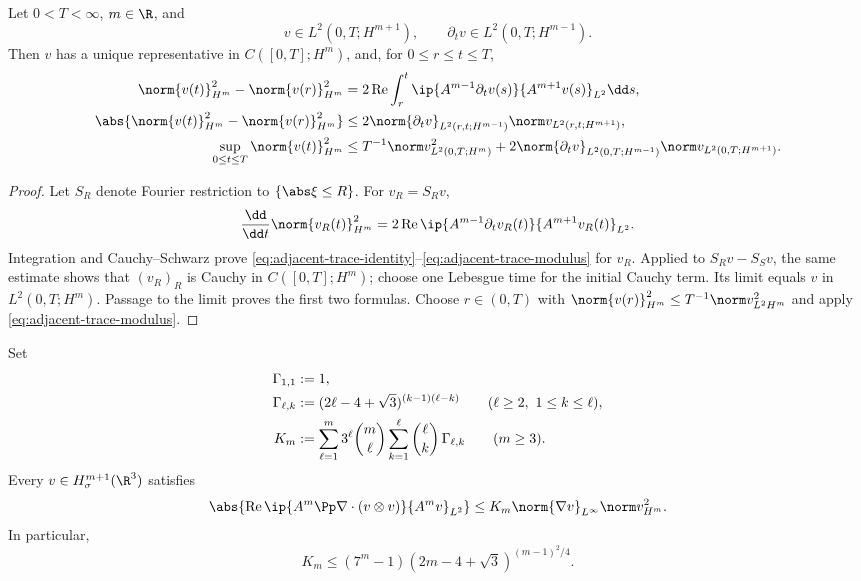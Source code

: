 \begin{lemma}
\label{lem:adjacent-trace}
Let \(0<T<\infty\), \(m\in\R\), and
\[
 v\in L^2(0,T;H^{m+1}),
 \qquad
 \partial_tv\in L^2(0,T;H^{m-1}).
\]
Then \(v\) has a unique representative in \(C([0,T];H^m)\), and, for
\(0\le r\le t\le T\),
\begin{align}
 \norm{v(t)}_{H^m}^2-\norm{v(r)}_{H^m}^2
 &=2\operatorname{Re}\int_r^t
 \ip{A^{m-1}\partial_tv(s)}{A^{m+1}v(s)}_{L^2}\dd s,
 \label{eq:adjacent-trace-identity}\\
 \abs{\norm{v(t)}_{H^m}^2-\norm{v(r)}_{H^m}^2}
 &\le2\norm{\partial_tv}_{L^2(r,t;H^{m-1})}
 \norm v_{L^2(r,t;H^{m+1})},
 \label{eq:adjacent-trace-modulus}\\
 \sup_{0\le t\le T}\norm{v(t)}_{H^m}^2
 &\le T^{-1}\norm v_{L^2(0,T;H^m)}^2
 +2\norm{\partial_tv}_{L^2(0,T;H^{m-1})}
 \norm v_{L^2(0,T;H^{m+1})}.
 \label{eq:adjacent-trace-sup}
\end{align}
\end{lemma}

\begin{proof}
Let \(S_R\) denote Fourier restriction to \(\{\abs\xi\le R\}\).  For
\(v_R=S_Rv\),
\[
 \frac{\dd}{\dd t}\norm{v_R(t)}_{H^m}^2
 =2\operatorname{Re}\ip{A^{m-1}\partial_tv_R(t)}
 {A^{m+1}v_R(t)}_{L^2}.
\]
Integration and Cauchy--Schwarz prove
\eqref{eq:adjacent-trace-identity}--\eqref{eq:adjacent-trace-modulus} for
\(v_R\).  Applied to \(S_Rv-S_Sv\), the same estimate shows that
\((v_R)_R\) is Cauchy in \(C([0,T];H^m)\); choose one Lebesgue time for the
initial Cauchy term.  Its limit equals \(v\) in
\(L^2(0,T;H^m)\).  Passage to the limit proves the first two formulas.
Choose \(r\in(0,T)\) with
\(\norm{v(r)}_{H^m}^2\le T^{-1}\norm v_{L^2H^m}^2\) and apply
\eqref{eq:adjacent-trace-modulus}.
\end{proof}

\begin{lemma}
\label{lem:transport-commutator}
Set
\begin{align}
 \Gamma_{1,1}&:=1,\notag\\
 \Gamma_{\ell,k}
 &:=(2\ell-4+\sqrt3)^{(k-1)(\ell-k)}
 \qquad(\ell\ge2,\ 1\le k\le\ell),
 \label{eq:explicit-Gamma-lk}\\
 K_m&:=
 \sum_{\ell=1}^{m}3^\ell\binom m\ell
 \sum_{k=1}^{\ell}\binom\ell k\,\Gamma_{\ell,k}
 \qquad(m\ge3).
 \label{eq:explicit-commutator-constant}
\end{align}
Every \(v\in H^{m+1}_\sigma(\R^3)\) satisfies
\begin{equation}
 \abs{\operatorname{Re}
 \ip{A^m\Pp\nabla\cdot(v\otimes v)}{A^mv}_{L^2}}
 \le K_m\norm{\nabla v}_{L^\infty}\norm v_{H^m}^2.
 \label{eq:transport-commutator}
\end{equation}
In particular,
\begin{equation}
 K_m\le(7^m-1)(2m-4+\sqrt3)^{(m-1)^2/4}.
 \label{eq:explicit-commutator-upper-bound}
\end{equation}
\end{lemma}

